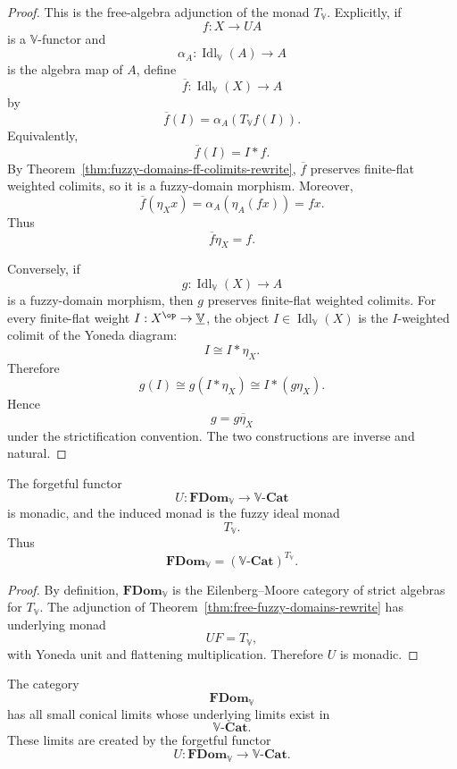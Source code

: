 \begin{proof}
This is the free-algebra adjunction of the monad \(T_{\mathbb V}\).  Explicitly,
if
\[
    f:X\to UA
\]
is a \(\mathbb V\)-functor and
\[
    \alpha_A:\operatorname{Idl}_{\mathbb V}(A)\to A
\]
is the algebra map of \(A\), define
\[
    \overline f:
    \operatorname{Idl}_{\mathbb V}(X)\to A
\]
by
\[
    \overline f(I)
    =
    \alpha_A(T_{\mathbb V}f(I)).
\]
Equivalently,
\[
    \overline f(I)=I*f.
\]
By Theorem~\ref{thm:fuzzy-domains-ff-colimits-rewrite},
\(\overline f\) preserves finite-flat weighted colimits, so it is a
fuzzy-domain morphism.  Moreover,
\[
    \overline f(\eta_Xx)
    =
    \alpha_A(\eta_A(fx))
    =
    fx.
\]
Thus
\[
    \overline f\eta_X=f.
\]

Conversely, if
\[
    g:\operatorname{Idl}_{\mathbb V}(X)\to A
\]
is a fuzzy-domain morphism, then \(g\) preserves finite-flat weighted colimits.
For every finite-flat weight \(I:X^{\op}\to\underline{\mathbb V}\), the object
\(I\in\operatorname{Idl}_{\mathbb V}(X)\) is the \(I\)-weighted colimit of the
Yoneda diagram:
\[
    I \cong I*\eta_X.
\]
Therefore
\[
    g(I)
    \cong
    g(I*\eta_X)
    \cong
    I*(g\eta_X).
\]
Hence
\[
    g=\overline{g\eta_X}
\]
under the strictification convention.  The two constructions are inverse and
natural.
\end{proof}

\begin{theorem}[Monadicity]
\label{thm:fdom-monadicity-rewrite}
The forgetful functor
\[
    U:\mathbf{FDom}_{\mathbb V}\to\mathbb V\text{-}\mathbf{Cat}
\]
is monadic, and the induced monad is the fuzzy ideal monad
\[
    T_{\mathbb V}.
\]
Thus
\[
    \mathbf{FDom}_{\mathbb V}
    =
    (\mathbb V\text{-}\mathbf{Cat})^{T_{\mathbb V}}.
\]
\end{theorem}

\begin{proof}
By definition, \(\mathbf{FDom}_{\mathbb V}\) is the Eilenberg--Moore category of
strict algebras for \(T_{\mathbb V}\).  The adjunction of
Theorem~\ref{thm:free-fuzzy-domains-rewrite} has underlying monad
\[
    UF=T_{\mathbb V},
\]
with Yoneda unit and flattening multiplication.  Therefore \(U\) is monadic.
\end{proof}

\begin{theorem}
\label{thm:fdom-limits-rewrite}
The category
\[
    \mathbf{FDom}_{\mathbb V}
\]
has all small conical limits whose underlying limits exist in
\[
    \mathbb V\text{-}\mathbf{Cat}.
\]
These limits are created by the forgetful functor
\[
    U:\mathbf{FDom}_{\mathbb V}\to\mathbb V\text{-}\mathbf{Cat}.
\]
\end{theorem}


